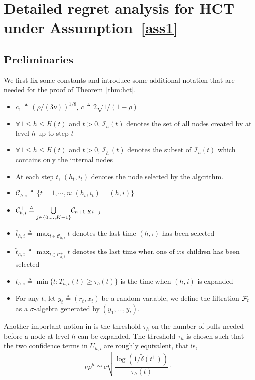 \section{Detailed regret analysis for HCT under Assumption~\ref{ass1}}\label{app:gpo.hct}

\subsection{Preliminaries}\label{proof:pre}
We first fix some constants and introduce some additional notation that are needed for the proof of Theorem~\ref{thm:hct}.
\begin{itemize}
    \item $c_1 \triangleq (\rho/(3\nu))^{1/8}$, $c \triangleq 2\sqrt{1/(1-\rho)}$
    \item $\forall 1\leq h\leq H(t)$ and $t>0$, $\mathcal{I}_h(t)$ denotes the set of all nodes created by \HCT at level $h$ up to step $t$
    \item $\forall 1\leq h\leq H(t)$ and $t>0$, $\mathcal{I}_h^{+}(t)$ denotes the subset of $\mathcal{I}_h(t)$ which contains only the internal nodes
    \item At each step $t$, $(h_t,i_t)$ denotes the node selected by the algorithm.
    \item $\mathcal{C}_{h,i} \triangleq \{t = 1,\cdots,n : (h_t,i_t) = (h,i)\}$
    \item $\mathcal{C}_{h,i}^{+} \triangleq \underset{j\in\{0,\ldots,K-1\}}{\bigcup} \mathcal{C}_{h+1,Ki-j}$
    \item $\overline{t}_{h,i} \triangleq \max_{t\in\mathcal{C}_{h,i}} t$ denotes the last time $(h,i)$ has been selected
    \item $\tilde{t}_{h,i} \triangleq \max_{t\in\mathcal{C}_{h,i}^{+}} t$ denotes the last time when one of its children has been selected
    \item $t_{h,i} \triangleq \min\{t: T_{h,i}(t) \geq \tau_h(t)\}$ is the time when $(h,i)$ is expanded
    \item For any $t$, let $y_t\triangleq(r_t,x_t)$ be a random variable, we define the filtration $\mathcal{F}_t$ as a $\sigma$-algebra generated by $(y_1,\ldots,y_t)$.
\end{itemize}
Another important notion in  \HCT  is the threshold $\tau_h$ on the number of pulls needed before a node at level $h$ can be expanded.
The threshold $\tau_h$ is chosen such that the two confidence terms in $U_{h,i}$ are roughly equivalent, that is,
\[
\nu\rho^h \simeq c\sqrt{\frac{\operatorname{log}(1/\tilde{\delta}(t^+))}{\tau_h(t)}}\cdot
\]
